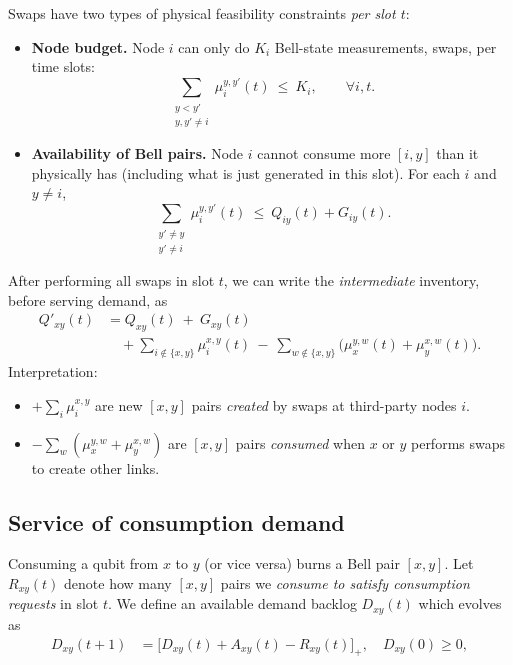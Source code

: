 \documentclass[11pt]{article}
\begin{document}
Swaps have two types of physical feasibility constraints \emph{per slot $t$}:
\begin{itemize}[leftmargin=2em]
\item \textbf{Node budget.} Node $i$ can only do $K_i$ Bell-state measurements, swaps, per time slots:
\begin{equation}
\sum_{\substack{y<y'\\ y,y'\neq i}}\mu_i^{y,y'}(t)\ \le\ K_i,
\qquad \forall i,t.
\label{eq:cap-phys}
\end{equation}

\item \textbf{Availability of Bell pairs.} Node $i$ cannot consume more $[i,y]$ than it physically has (including what is just generated in this slot). For each $i$ and $y\neq i$,
\begin{equation}
\sum_{\substack{y'\neq y\\ y'\neq i}}\mu_i^{y,y'}(t)
\ \le\ Q_{iy}(t)+G_{iy}(t).
\label{eq:avail-phys}
\end{equation}
\end{itemize}

After performing all swaps in slot $t$, we can write the \emph{intermediate} inventory,
before serving demand, as
\begin{equation}
\begin{aligned}
Q'_{xy}(t)
&= Q_{xy}(t)\ +\ G_{xy}(t) \\
&\quad + \sum_{i\notin\{x,y\}}\mu_i^{x,y}(t)
\ -\ \sum_{w\notin\{x,y\}}
\big(\mu_x^{y,w}(t)+\mu_y^{x,w}(t)\big) .
\end{aligned}
\label{eq:Qprime-phys}
\end{equation}
Interpretation:
\begin{itemize}[leftmargin=2em]
\item $+\sum_i \mu_i^{x,y}$ are new $[x,y]$ pairs \emph{created} by swaps at third-party nodes $i$.
\item $-\sum_w(\mu_x^{y,w}+\mu_y^{x,w})$ are $[x,y]$ pairs \emph{consumed} when $x$ or $y$ performs swaps to create other links.
\end{itemize}

\subsection{Service of consumption demand}

Consuming a qubit from $x$ to $y$ (or vice versa) burns a Bell pair $[x,y]$. Let $R_{xy}(t)$ denote how many $[x,y]$ pairs we \emph{consume to satisfy consumption requests} in slot $t$. We define an available demand backlog $D_{xy}(t)$ which evolves as
\begin{align}
D_{xy}(t{+}1)
&=\big[D_{xy}(t)+A_{xy}(t)-R_{xy}(t)\big]_+ , \quad D_{xy}(0)\ge 0,
\label{eq:D-backlog}
\end{align}
\end{document}
